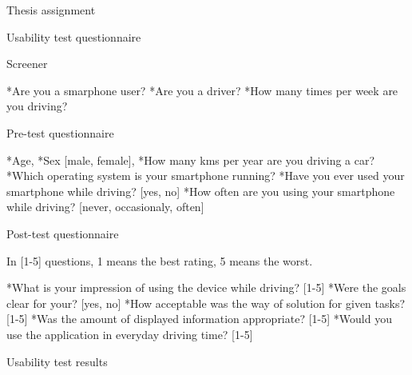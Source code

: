 \def\slet#1#2{\expandafter\let\csname#1\expandafter\endcsname\csname#2\endcsname}
\addto\begitems{\slet{normalitem}{item:o}}


\app Thesis assignment

\nextoddpage


\app Usability test questionnaire

\sec Screener

	\begitems
		*Are you a smarphone user?
		*Are you a driver?
		*How many times per week are you driving?
	\enditems

\sec Pre-test questionnaire

	\begitems
		*Age,
		*Sex [male, female],
		*How many kms per year are you driving a car?
		*Which operating system is your smartphone running?
		*Have you ever used your smartphone while driving? [yes, no]
		*How often are you using your smartphone while driving? [never, occasionaly, often]
	\enditems

\sec Post-test questionnaire

In [1-5] questions, 1 means the best rating, 5 means the worst.

	\begitems
		*What is your impression of using the device while driving? [1-5]
		*Were the goals clear for your? [yes, no]
		*How acceptable was the way of solution for given tasks? [1-5]
		*Was the amount of displayed information appropriate? [1-5]
		*Would you use the application in everyday driving time? [1-5]
	\enditems


\app Usability test results

